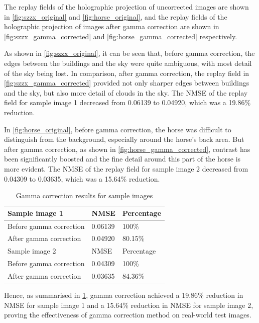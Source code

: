 The replay fields of the holographic projection of uncorrected images are shown in \cref{fig:szzx_original} and \cref{fig:horse_original}, and the replay fields of the holographic projection of images after gamma correction are shown in \cref{fig:szzx_gamma_corrected} and \cref{fig:horse_gamma_corrected} respectively.

As shown in \cref{fig:szzx_original}, it can be seen that, before gamma correction, the edges between the buildings and the sky were quite ambiguous, with most detail of the sky being lost. In comparison, after gamma correction, the replay field in \cref{fig:szzx_gamma_corrected} provided not only sharper edges between buildings and the sky, but also more detail of clouds in the sky. The NMSE of the replay field for sample image 1 decreased from 0.06139 to 0.04920, which was a 19.86\% reduction.

In \cref{fig:horse_original}, before gamma correction, the horse was difficult to distinguish from the background, especially around the horse's back area. But after gamma correction, as shown in \cref{fig:horse_gamma_corrected}, contrast has been significantly boosted and the fine detail around this part of the horse is more evident. The NMSE of the replay field for sample image 2 decreased from 0.04309 to 0.03635, which was a 15.64\% reduction.

\begin{table}[H]
  \caption{Gamma correction results for sample images}
  \centering
  \label{tab:Gamma correction results for sample images}
  \begin{tabular}{lll}
    \toprule
    Sample image 1          & NMSE    & Percentage \\
    \midrule
    Before gamma correction & 0.06139 & 100\%      \\
    After gamma correction  & 0.04920 & 80.15\%    \\
    \midrule
    \midrule
    Sample image 2          & NMSE    & Percentage \\
    \midrule
    Before gamma correction & 0.04309 & 100\%      \\
    After gamma correction  & 0.03635 & 84.36\%    \\
    \bottomrule
  \end{tabular}
\end{table}

Hence, as summarised in \cref{tab:Gamma correction results for sample images}, gamma correction achieved a 19.86\% reduction in NMSE for sample image 1 and a 15.64\% reduction in NMSE for sample image 2, proving the effectiveness of gamma correction method on real-world test images.



